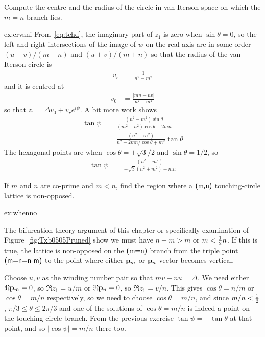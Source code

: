 \begin{jExercise}\label{ex:crvani}
		Compute the centre and the radius of the circle in van Iterson space on which the $m=n$ branch lies.
\end{jExercise}

\begin{jAnswer}{ex:crvani}{
		From~\eqref{eq:tchd}, the imaginary part of $z_1$ is zero when  $\sin\theta=0$, so the left and right intersections of the image of $w$ on the real axis are in some order $(u-v)/(m-n)$ and $(u+v)/(m+n)$ so that the radius of the van Iterson circle
		is
\begin{align}	
			v_r &= \frac{1}{n^2-m^2}
\end{align}
and it is centred at
\begin{align}			v_0 &= \frac{|m u - n v|}{n^2-m^2}
\end{align}	so that $z_1=\Delta v_0 + v_r e^{i\psi}$. 
A bit more work shows
\begin{align}
	\tan \psi &= \frac{ (n^2-m^2)\sin \theta}{(m^2+n^2)\cos\theta-2mn}
	\\
	&= \frac{ (n^2-m^2)}{n^2-2mn/\cos\theta+m^2}\tan\theta
\end{align}
The hexagonal points are when $\cos\theta=\pm\sqrt{3}/2$ and $\sin\theta=1/2$, so
\begin{align}
	\tan \psi 
	&= \frac{ (n^2-m^2)}{\pm\sqrt{3}(n^2+m^2)-mn }
\end{align}
}
	\end{jAnswer}
	
	\begin{jExercise}\label{ex:whenno}
		If $m$ and $n$ are co-prime and $m<n$, find the region where a $\textsf{(m,n)}$ touching-circle lattice is non-opposed.
		
	\end{jExercise}
	\begin{jAnswer}{ex:whenno}{
		The bifurcation theory argument of this chapter or specifically examination of Figure~\ref{fig:Txb0505Pruned} show we must have $n-m>m$ or $ m < \textstyle{\frac{1}{2}} n$. If this is true, 
		the lattice is non-opposed  on the $\textsf{(m=n)}$ branch from the triple point $\textsf{(m=n=n-m)}$ to the point where either ${\mathbf p}_{m}$ or ${\mathbf p}_{n}$ vector becomes vertical.

			Choose $u,v$ as the winding number pair so that $m v - n u=\Delta$. We need either $\Re {\mathbf p}_{m}=0$, so $\Re z_1=u/m$ or $\Re {\mathbf p}_{n}=0$, so $\Re z_1=v/n$. This gives $\cos\theta=n/m$ or $\cos\theta=m/n$ respectively, so we need to choose $\cos\theta=m/n$,
			and since $m/n<\textstyle{\frac{1}{2}}$, $\pi/3\leq\theta\leq 2\pi/3$ and one of the solutions of  $\cos\theta=m/n$ is indeed a point on the touching circle
			 branch. From the previous exercise $\tan\psi=-\tan\theta$ at that point, 
			 and so $|\cos\psi|=m/n$ there too. 
}	\end{jAnswer}
	


